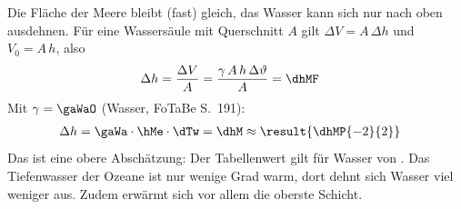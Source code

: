 Die Fläche der Meere bleibt (fast) gleich, das Wasser kann sich nur nach oben ausdehnen. Für eine Wassersäule mit Querschnitt $A$ gilt $\Delta V = A\,\Delta h$ und $V_0 = A\,h$, also
\begin{align}
 \Delta h &= \frac{\Delta V}{A} = \frac{\gamma\,A\,h\,\Delta\vartheta}{A} = \dhMF
\end{align}
Mit $\gamma = \gaWaO$ (Wasser, FoTaBe S.~191):
\begin{align}
 \Delta h &= \gaWa\cdot\hMe\cdot\dTw = \dhM \approx \result{\dhMP{-2}{2}}
\end{align}
Das ist eine obere Abschätzung: Der Tabellenwert gilt für Wasser von \TtbO. Das Tiefenwasser der Ozeane ist nur wenige Grad warm, dort dehnt sich Wasser viel weniger aus. Zudem erwärmt sich vor allem die oberste Schicht.
